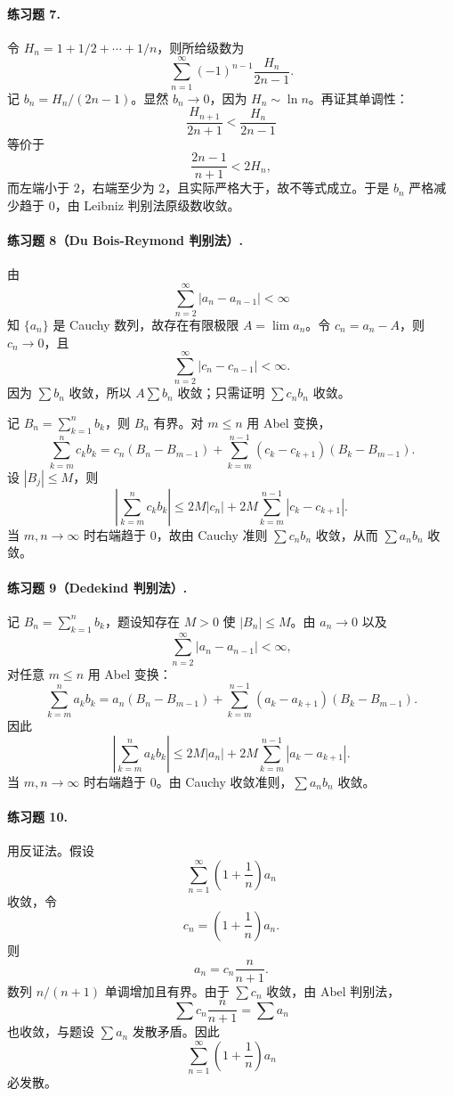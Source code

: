 \paragraph{练习题 7.}
\begin{xsolution}
令 $H_n=1+1/2+\cdots+1/n$，则所给级数为
\[
 \sum_{n=1}^{\infty}(-1)^{n-1}\frac{H_n}{2n-1}.
\]
记 $b_n=H_n/(2n-1)$。显然 $b_n\to0$，因为 $H_n\sim\ln n$。再证其单调性：
\[
 \frac{H_{n+1}}{2n+1}<\frac{H_n}{2n-1}
\]
等价于
\[
 \frac{2n-1}{n+1}<2H_n,
\]
而左端小于 $2$，右端至少为 $2$，且实际严格大于，故不等式成立。于是 $b_n$ 严格减少趋于 $0$，由 Leibniz 判别法原级数收敛。
\end{xsolution}

\paragraph{练习题 8（Du Bois-Reymond 判别法）.}
\begin{xsolution}
由
\[
 \sum_{n=2}^{\infty}|a_n-a_{n-1}|<\infty
\]
知 $\{a_n\}$ 是 Cauchy 数列，故存在有限极限 $A=\lim a_n$。令 $c_n=a_n-A$，则 $c_n\to0$，且
\[
 \sum_{n=2}^{\infty}|c_n-c_{n-1}|<\infty.
\]
因为 $\sum b_n$ 收敛，所以 $A\sum b_n$ 收敛；只需证明 $\sum c_nb_n$ 收敛。

记 $B_n=\sum_{k=1}^{n}b_k$，则 $B_n$ 有界。对 $m\leq n$ 用 Abel 变换，
\[
 \sum_{k=m}^{n}c_kb_k
 =c_n(B_n-B_{m-1})
 +\sum_{k=m}^{n-1}(c_k-c_{k+1})(B_k-B_{m-1}).
\]
设 $|B_j|\leq M$，则
\[
 \left|\sum_{k=m}^{n}c_kb_k\right|
 \leq2M|c_n|+2M\sum_{k=m}^{n-1}|c_k-c_{k+1}|.
\]
当 $m,n\to\infty$ 时右端趋于 $0$，故由 Cauchy 准则 $\sum c_nb_n$ 收敛，从而 $\sum a_nb_n$ 收敛。
\end{xsolution}

\paragraph{练习题 9（Dedekind 判别法）.}
\begin{xsolution}
记 $B_n=\sum_{k=1}^{n}b_k$，题设知存在 $M>0$ 使 $|B_n|\leq M$。由 $a_n\to0$ 以及
\[
 \sum_{n=2}^{\infty}|a_n-a_{n-1}|<\infty,
\]
对任意 $m\leq n$ 用 Abel 变换：
\[
 \sum_{k=m}^{n}a_kb_k
 =a_n(B_n-B_{m-1})
 +\sum_{k=m}^{n-1}(a_k-a_{k+1})(B_k-B_{m-1}).
\]
因此
\[
 \left|\sum_{k=m}^{n}a_kb_k\right|
 \leq2M|a_n|+2M\sum_{k=m}^{n-1}|a_k-a_{k+1}|.
\]
当 $m,n\to\infty$ 时右端趋于 $0$。由 Cauchy 收敛准则，$\sum a_nb_n$ 收敛。
\end{xsolution}

\paragraph{练习题 10.}
\begin{xsolution}
用反证法。假设
\[
 \sum_{n=1}^{\infty}\left(1+\frac1n\right)a_n
\]
收敛，令
\[
 c_n=\left(1+\frac1n\right)a_n.
\]
则
\[
 a_n=c_n\frac{n}{n+1}.
\]
数列 $n/(n+1)$ 单调增加且有界。由于 $\sum c_n$ 收敛，由 Abel 判别法，
\[
 \sum c_n\frac{n}{n+1}=\sum a_n
\]
也收敛，与题设 $\sum a_n$ 发散矛盾。因此
\[
 \sum_{n=1}^{\infty}\left(1+\frac1n\right)a_n
\]
必发散。
\end{xsolution}

